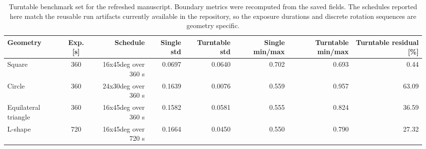 \begin{table}[tb]
\centering
\caption{Turntable benchmark set for the refreshed manuscript. Boundary metrics were recomputed from the saved fields. The schedules reported here match the reusable run artifacts currently available in the repository, so the exposure durations and discrete rotation sequences are geometry specific.}
\label{tab:turntable_core_refresh}
\small
\begin{tabular}{lcrrrrrr}
\toprule
Geometry & Exp. [s] & Schedule & Single std & Turntable std & Single min/max & Turntable min/max & Turntable residual [\%] \\
\midrule
Square & 360 & 16x45deg over 360 s & 0.0697 & 0.0640 & 0.702 & 0.693 & 0.44 \\
Circle & 360 & 24x30deg over 360 s & 0.1639 & 0.0076 & 0.559 & 0.957 & 63.09 \\
Equilateral triangle & 360 & 16x45deg over 360 s & 0.1582 & 0.0581 & 0.555 & 0.824 & 36.59 \\
L-shape & 720 & 16x45deg over 720 s & 0.1664 & 0.0450 & 0.550 & 0.790 & 27.32 \\
\bottomrule
\end{tabular}
\end{table}